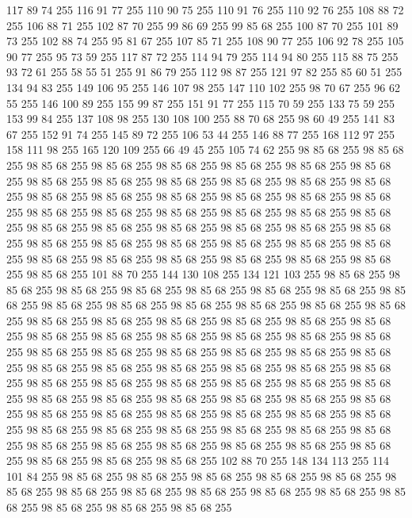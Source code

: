 117 89 74 255 116 91 77 255 110 90 75 255 110 91 76 255 110 92 76 255 108 88 72 255 106 88 71 255 102 87 70 255 99 86 69 255 99 85 68 255 100 87 70 255 101 89 73 255 102 88 74 255 95 81 67 255 107 85 71 255 108 90 77 255 106 92 78 255 105 90 77 255 95 73 59 255 117 87 72 255 114 94 79 255 114 94 80 255 115 88 75 255 93 72 61 255 58 55 51 255 91 86 79 255 112 98 87 255 121 97 82 255 85 60 51 255 134 94 83 255 149 106 95 255 146 107 98 255 147 110 102 255 98 70 67 255 96 62 55 255 146 100 89 255 155 99 87 255 151 91 77 255 115 70 59 255 133 75 59 255 153 99 84 255 137 108 98 255 130 108 100 255 88 70 68 255 98 60 49 255 141 83 67 255 152 91 74 255 145 89 72 255 106 53 44 255 146 88 77 255 168 112 97 255 158 111 98 255 165 120 109 255 66 49 45 255 105 74 62 255 98 85 68 255 98 85 68 255 98 85 68 255 98 85 68 255 98 85 68 255 98 85 68 255 98 85 68 255 98 85 68 255 98 85 68 255
98 85 68 255 98 85 68 255 98 85 68 255 98 85 68 255 98 85 68 255 98 85 68 255 98 85 68 255 98 85 68 255 98 85 68 255 98 85 68 255 98 85 68 255 98 85 68 255 98 85 68 255 98 85 68 255 98 85 68 255 98 85 68 255 98 85 68 255 98 85 68 255 98 85 68 255 98 85 68 255 98 85 68 255 98 85 68 255 98 85 68 255 98 85 68 255 98 85 68 255 98 85 68 255 98 85 68 255 98 85 68 255 98 85 68 255 98 85 68 255 98 85 68 255 98 85 68 255 98 85 68 255 98 85 68 255 98 85 68 255 98 85 68 255 101 88 70 255 144 130 108 255 134 121 103 255 98 85 68 255 98 85 68 255 98 85 68 255 98 85 68 255 98 85 68 255 98 85 68 255 98 85 68 255 98 85 68 255 98 85 68 255 98 85 68 255 98 85 68 255 98 85 68 255 98 85 68 255 98 85 68 255 98 85 68 255 98 85 68 255 98 85 68 255 98 85 68 255 98 85 68 255 98 85 68 255 98 85 68 255 98 85 68 255 98 85 68 255 98 85 68 255 98 85 68 255
98 85 68 255 98 85 68 255 98 85 68 255 98 85 68 255 98 85 68 255 98 85 68 255 98 85 68 255 98 85 68 255 98 85 68 255 98 85 68 255 98 85 68 255 98 85 68 255 98 85 68 255 98 85 68 255 98 85 68 255 98 85 68 255 98 85 68 255 98 85 68 255 98 85 68 255 98 85 68 255 98 85 68 255 98 85 68 255 98 85 68 255 98 85 68 255 98 85 68 255 98 85 68 255 98 85 68 255 98 85 68 255 98 85 68 255 98 85 68 255 98 85 68 255 98 85 68 255 98 85 68 255 98 85 68 255 98 85 68 255 98 85 68 255 98 85 68 255 98 85 68 255 98 85 68 255 98 85 68 255 98 85 68 255 98 85 68 255 98 85 68 255 98 85 68 255 98 85 68 255 98 85 68 255 102 88 70 255 148 134 113 255 114 101 84 255 98 85 68 255 98 85 68 255 98 85 68 255 98 85 68 255 98 85 68 255 98 85 68 255 98 85 68 255 98 85 68 255 98 85 68 255 98 85 68 255 98 85 68 255 98 85 68 255 98 85 68 255 98 85 68 255 98 85 68 255
